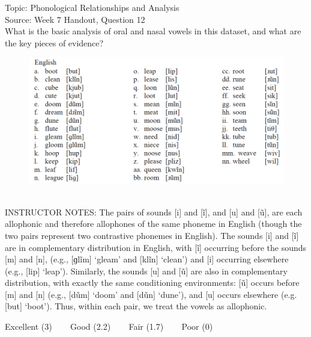\documentclass[12pt]{article}
\begin{document}
Topic: Phonological Relationships and Analysis\\
Source: Week 7 Handout, Question 12\\

What is the basic analysis of oral and nasal vowels in this dataset, and what are the key pieces of evidence?\\

\begin{figure}[H]
\includegraphics{../images/english12.png}
\end{figure}

~\\
INSTRUCTOR NOTES: The pairs of sounds [i] and [ĩ], and [u] and [ũ], are each allophonic and therefore allophones of the same phoneme in English (though the two pairs represent two contrastive phonemes in English). The sounds [i] and [ĩ] are in complementary distribution in English, with [ĩ] occurring before the sounds [m] and [n], (e.g., [ɡlĩm] ‘gleam’ and [klĩn] ‘clean’) and [i] occurring elsewhere (e.g., [lip] ‘leap’). Similarly, the sounds [u] and [ũ] are also in complementary distribution, with exactly the same conditioning environments: [ũ] occurs before [m] and [n] (e.g., [dũm] ‘doom’ and [dũn] ‘dune’), and [u] occurs elsewhere (e.g. [but] ‘boot’). Thus, within each pair, we treat the vowels as allophonic. 


\vfill
Excellent (3) ~~~ Good (2.2) ~~~ Fair (1.7) ~~~ Poor (0)
\newpage

\begin{center}
\textbf{{\color{red}{\HUGE END OF EXAM}}}\\

\end{center}
\newpage

\begin{center}
\textbf{{\color{blue}{\HUGE START OF EXAM\\}}}

\textbf{{\color{blue}{\HUGE Student ID: 83639\\}}}

\textbf{{\color{blue}{\HUGE \\}}}

\end{center}
\newpage
\end{document}
